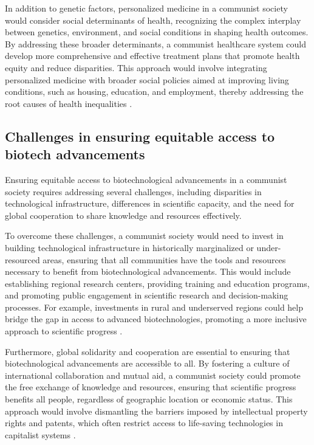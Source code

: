 In addition to genetic factors, personalized medicine in a communist society would consider social determinants of health, recognizing the complex interplay between genetics, environment, and social conditions in shaping health outcomes. By addressing these broader determinants, a communist healthcare system could develop more comprehensive and effective treatment plans that promote health equity and reduce disparities. This approach would involve integrating personalized medicine with broader social policies aimed at improving living conditions, such as housing, education, and employment, thereby addressing the root causes of health inequalities \cite[pp.~370-375]{johnson2019genomics}.

\subsection{Challenges in ensuring equitable access to biotech advancements}

Ensuring equitable access to biotechnological advancements in a communist society requires addressing several challenges, including disparities in technological infrastructure, differences in scientific capacity, and the need for global cooperation to share knowledge and resources effectively.

To overcome these challenges, a communist society would need to invest in building technological infrastructure in historically marginalized or under-resourced areas, ensuring that all communities have the tools and resources necessary to benefit from biotechnological advancements. This would include establishing regional research centers, providing training and education programs, and promoting public engagement in scientific research and decision-making processes. For example, investments in rural and underserved regions could help bridge the gap in access to advanced biotechnologies, promoting a more inclusive approach to scientific progress \cite[pp.~400-405]{nguyen2021equity}.

Furthermore, global solidarity and cooperation are essential to ensuring that biotechnological advancements are accessible to all. By fostering a culture of international collaboration and mutual aid, a communist society could promote the free exchange of knowledge and resources, ensuring that scientific progress benefits all people, regardless of geographic location or economic status. This approach would involve dismantling the barriers imposed by intellectual property rights and patents, which often restrict access to life-saving technologies in capitalist systems \cite[pp.~500-505]{brown2022solidarity}.

